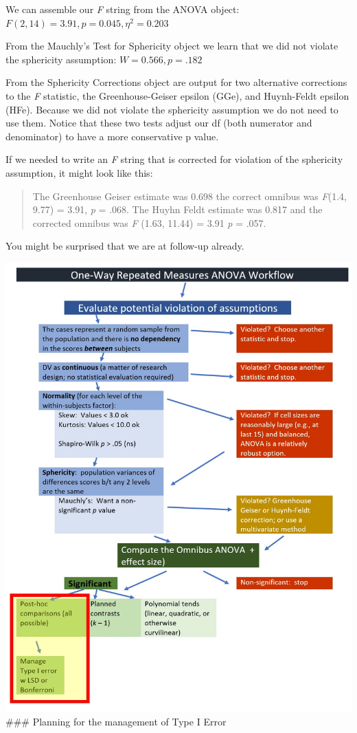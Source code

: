 \documentclass[
  11pt,
]{book}
\begin{document}
We can assemble our \emph{F} string from the ANOVA object: \(F(2,14) = 3.91, p = 0.045, \eta^2 = 0.203\)

From the Mauchly's Test for Sphericity object we learn that we did not violate the sphericity assumption: \(W = 0.566, p = .182\)

From the Sphericity Corrections object are output for two alternative corrections to the \emph{F} statistic, the Greenhouse-Geiser epsilon (GGe), and Huynh-Feldt epsilon (HFe). Because we did not violate the sphericity assumption we do not need to use them. Notice that these two tests adjust our df (both numerator and denominator) to have a more conservative p value.

If we needed to write an \emph{F} string that is corrected for violation of the sphericity assumption, it might look like this:

\begin{quote}
The Greenhouse Geiser estimate was 0.698 the correct omnibus was \emph{F}(1.4, 9.77) = 3.91, \emph{p} = .068. The Huyhn Feldt estimate was 0.817 and the corrected omnibus was \emph{F} (1.63, 11.44) = 3.91 \emph{p} = .057.
\end{quote}

You might be surprised that we are at follow-up already.

\includegraphics{images/oneway_repeated/wf_rptd_pairwise.jpg} \#\#\# Planning for the management of Type I Error
\end{document}

